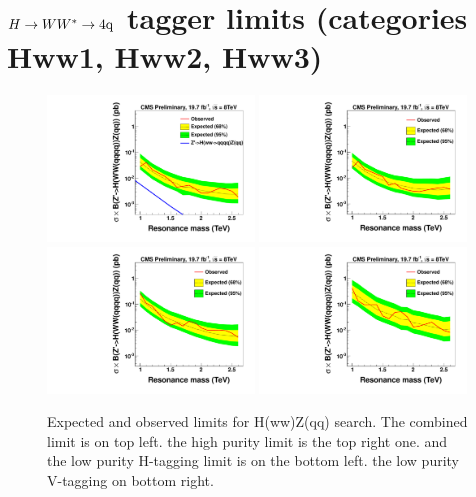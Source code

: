 \newpage
\section{$H\to WW^*\to4{\rm q}$ tagger limits (categories Hww1, Hww2, Hww3)}
\label{results}

\iffalse

\begin{figure}[h!tpb]
\begin{center}
\includegraphics[width=0.49\textwidth]{HqqqqZqqfigs/Limits/brazilianFlag_Hww_Combine.pdf}
\includegraphics[width=0.49\textwidth]{HqqqqZqqfigs/Limits/brazilianFlag_Hww_.pdf}
\includegraphics[width=0.49\textwidth]{HqqqqZqqfigs/Limits/brazilianFlag_Hww_LowH.pdf}
\includegraphics[width=0.49\textwidth]{HqqqqZqqfigs/Limits/brazilianFlag_Hww_LowV.pdf}
\end{center}
\caption{Expected and observed limits for H(ww)Z(qq) search. The combined limit is on top left. the high purity limit
is the top right one. and the low purity H-tagging limit is on the bottom left. the low purity V-tagging on bottom right.   
}
\label{fig:HwwZqqLimits}
\end{figure}

